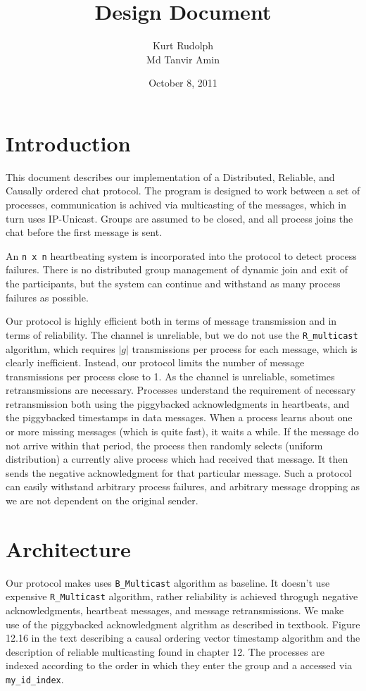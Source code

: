 \documentclass[11pt]{report}
\title{Design Document}
\author{Kurt Rudolph \\ Md Tanvir Amin}
\date{ October 8, 2011}                                           %
\begin{document}
\maketitle
\tableofcontents
\newpage

\chapter{Introduction}

This document describes our implementation of a Distributed, Reliable, and Causally ordered chat protocol. The program is designed to work between a set of processes, communication is achived via multicasting of the messages, which in turn uses IP-Unicast.  Groups are assumed to be closed, and all process joins the chat before the first message is sent. 

An \verb+n x n+ heartbeating system is incorporated into the protocol to detect process failures. There is no distributed group management of dynamic join and exit of the participants, but the system can continue and withstand as many process failures as possible.

Our protocol is highly efficient both in terms of message transmission and in terms of reliability. The channel is unreliable, but we do not use the \verb+R_multicast+ algorithm, which requires $|g|$ transmissions per process for each message, which is clearly inefficient. Instead, our protocol limits the number of message transmissions per process close to 1. As the channel is unreliable, sometimes retransmissions are necessary. Processes understand the requirement of necessary retransmission both using the piggybacked acknowledgments in heartbeats, and the piggybacked timestamps in data messages. When a process learns about one or more missing messages (which is quite fast), it waits a while. If the message do not arrive within that period, the process then randomly selects (uniform distribution) a currently alive process which had received that message. It then sends the negative acknowledgment for that particular message. Such a protocol can easily withstand arbitrary process failures, and arbitrary message dropping as we are not dependent on the original sender. 



\chapter{ Architecture }

Our protocol makes uses \verb+B_Multicast+ algorithm as baseline. It doesn't use expensive \verb+R_Multicast+ algorithm, rather reliability is achieved throgugh negative acknowledgments, heartbeat messages, and message retransmissions. We make use of the piggybacked acknowledgment algrithm as described in textbook. Figure 12.16 in the text describing a causal ordering vector timestamp algorithm and the description of reliable multicasting found in chapter 12.  The processes are indexed according to the order in which they enter the group and a accessed via \verb+my_id_index+.
\end{document}
